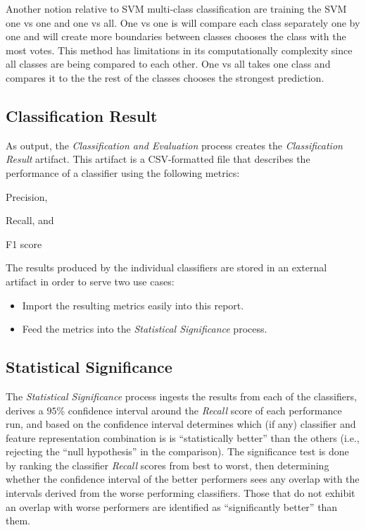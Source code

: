 \documentclass[conference]{sig-alternate-05-2015}
\begin{document}
Another notion relative to SVM multi-class classification are training the SVM
one vs one and one vs all. One vs one is will compare each class separately one
by one and will create more boundaries between classes chooses the class with
the most votes. This method has limitations in its computationally complexity
since all classes are being compared to each other. One vs all takes one class
and compares it to the the rest of the classes chooses the strongest prediction.
\par

\subsection{Classification Result}\label{subsec:classification_result}
As output, the \textit{Classification and Evaluation} process creates the
\textit{Classification Result} artifact. This artifact is a CSV-formatted file
that describes the performance of a classifier using the following metrics:
\begin{enumerate*}[(1)]
  \item Precision,
  \item Recall, and
  \item F1 score
\end{enumerate*}

The results produced by the individual classifiers are stored in an external
artifact in order to serve two use cases:

\begin{itemize}
  \item Import the resulting metrics easily into this report.
  \item Feed the metrics into the \textit{Statistical Significance} process.
\end{itemize}

\subsection{Statistical Significance}\label{subsec:stat_significance}
The \textit{Statistical Significance} process ingests the results from each of
the classifiers, derives a $95$\% confidence interval around the \textit{Recall}
score of each performance run, and based on the confidence interval determines
which (if any) classifier and feature representation combination is is
``statistically better'' than the others (i.e., rejecting the
``null hypothesis'' in the comparison). The significance test is done by ranking
the classifier \textit{Recall} scores from best to worst, then determining
whether the confidence interval of the better performers sees any overlap with
the intervals derived from the worse performing classifiers. Those that do not
exhibit an overlap with worse performers are identified as ``significantly
better'' than them.\par
\end{document}
